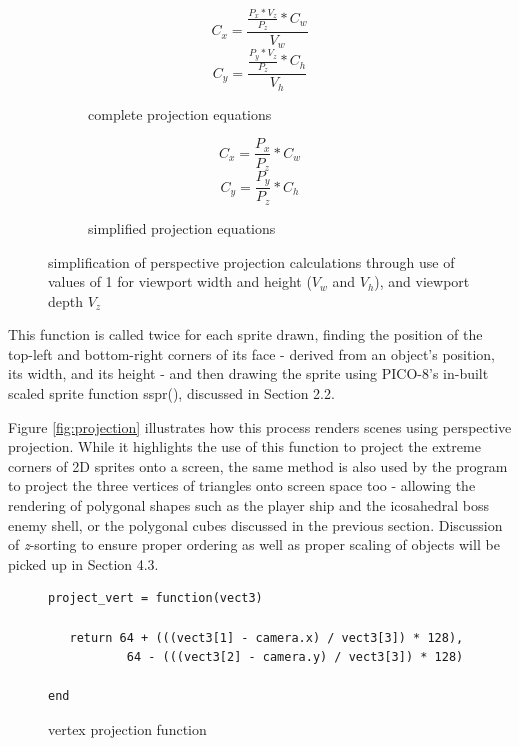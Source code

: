 \documentclass{article}
\begin{document}
\begin{figure}[h]
   \begin{subfigure}{.45\textwidth}
   \centering
      \begin{equation}
         C_x = \frac{\frac{P_x * V_z} {P_z} * C_w} {V_w}
      \end{equation}
      \begin{equation}
         C_y = \frac{\frac{P_y * V_z} {P_z} * C_h} {V_h}
      \end{equation}
   \caption{complete projection equations}
   \label{fig:equationfullproject}
   \end{subfigure}\hfill
   \begin{subfigure}{.45\textwidth}
   \centering
      \begin{equation}
         C_x = \frac{P_x} {P_z} * C_w
      \end{equation}
      \begin{equation}
         C_y = \frac{P_y} {P_z} * C_h
      \end{equation}
   \caption{simplified projection equations}
   \label{fig:equationsimpleproject}
   \end{subfigure}\hfill
\caption{simplification of perspective projection calculations through use of values of 1 for viewport width
and height ($V_w$ and $V_h$), and viewport depth $V_z$}
\label{fig:equationsproject}
\end{figure}

This function is called twice for each sprite drawn, finding the position of the top-left and bottom-right
corners of its face - derived from an object's position, its width, and its height - and then drawing the
sprite using PICO-8's in-built scaled sprite function sspr(), discussed in Section 2.2.

Figure \ref{fig:projection} illustrates how this process renders scenes using perspective projection.
While it highlights the use of this function to project the extreme corners of 2D sprites onto a screen,
the same method is also used by the program to project the three vertices of triangles onto screen space
too - allowing the rendering of polygonal shapes such as the player ship and the icosahedral boss enemy shell,
or the polygonal cubes discussed in the previous section. Discussion of \textit{z}-sorting to ensure proper
ordering as well as proper scaling of objects will be picked up in Section 4.3.

\begin{figure}[h]
   \begin{lstlisting}
project_vert = function(vect3)

   return 64 + (((vect3[1] - camera.x) / vect3[3]) * 128),
           64 - (((vect3[2] - camera.y) / vect3[3]) * 128)

end
   \end{lstlisting}
   \caption{vertex projection function}
   \label{fig:codeproject}
\end{figure}
\end{document}
